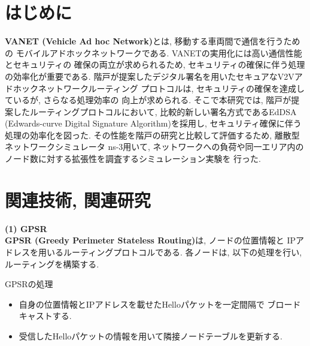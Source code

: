 \documentclass[a4j,9pt,twocolumn]{jsarticle}
\begin{document}
\pagestyle{empty} %

\section{はじめに}
\textbf{VANET (Vehicle Ad hoc Network)}とは, 移動する車両間で通信を行うための
モバイルアドホックネットワークである. VANETの実用化には高い通信性能とセキュリティの
確保の両立が求められるため, セキュリティの確保に伴う処理の効率化が重要である. 
階戸が提案したデジタル署名を用いたセキュアなV2Vアドホックネットワークルーティング
プロトコル\cite{shinato}は, セキュリティの確保を達成しているが, さらなる処理効率の
向上が求められる. そこで本研究では, 階戸が提案したルーティングプロトコルにおいて, 
比較的新しい署名方式であるEdDSA (Edwards-curve Digital Signature Algorithm)を採用し, 
セキュリティ確保に伴う処理の効率化を図った.  
その性能を階戸の研究と比較して評価するため, 離散型ネットワークシミュレータ ns-3用いて, 
ネットワークへの負荷や同一エリア内のノード数に対する拡張性を調査するシミュレーション実験を
行った. 
\section{関連技術, 関連研究}
\noindent \textbf{(1) GPSR}\\
\indent \textbf{GPSR (Greedy Perimeter Stateless Routing)}\cite{gpsr}は, ノードの位置情報と
IPアドレスを用いるルーティングプロトコルである. 各ノードは, 以下の処理を行い, 
ルーティングを構築する. 
\begin{itembox}[l]{GPSRの処理}
  \begin{itemize}
    \item 自身の位置情報とIPアドレスを載せたHelloパケットを一定間隔で
    ブロードキャストする.
    \item 受信したHelloパケットの情報を用いて隣接ノードテーブルを更新する.
  \end{itemize}
\end{itembox}
\end{document}
